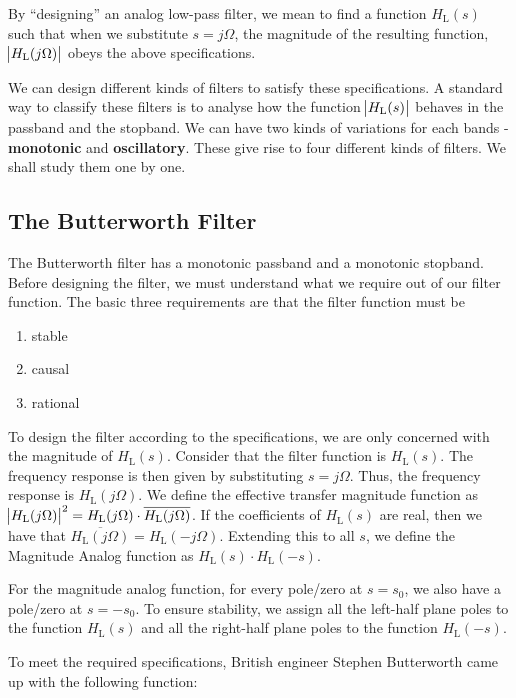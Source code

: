 \documentclass{article}
\theoremstyle{definition}
\begin{document}
By ``designing'' an analog low-pass filter, we mean to find a function $H_{\text{L}}(s)$ such that when we substitute $s = j \Omega$, the magnitude of the resulting function,  $\abs{H_{\text{L}}(j \Omega)}$ obeys the above specifications. \smallskip

We can design different kinds of filters to satisfy these specifications. A standard way to classify these filters is to analyse how the function $\abs{H_{\text{L}}(s)}$ behaves in the passband and the stopband. We can have two kinds of variations for each bands - \textbf{monotonic} and \textbf{oscillatory}. These give rise to four different kinds of filters. We shall study them one by one.

\subsection{The Butterworth Filter}

The Butterworth filter has a monotonic passband and a monotonic stopband. Before designing the filter, we must understand what we require out of our filter function. The basic three requirements are that the filter function must be
\begin{enumerate}
    \item stable
    \item causal
    \item rational
\end{enumerate}

To design the filter according to the specifications, we are only concerned with the magnitude of $H_{\text{L}}(s)$. Consider that the filter function is $H_{\text{L}}(s)$. The frequency response is then given by substituting $s = j \Omega$. Thus, the frequency response is $H_{\text{L}}(j \Omega)$. We define the effective transfer magnitude function as $\abs{H_{\text{L}}(j\Omega)}^2 = H_{\text{L}}(j\Omega) \cdot \overline{H_{\text{L}}(j\Omega)}$. If the coefficients of $H_{\text{L}}(s)$ are real, then we have that $\overline{H_{\text{L}}(j \Omega)} = H_{\text{L}}( -j \Omega)$. Extending this to all $s$, we define the Magnitude Analog function as $H_{\text{L}}(s) \cdot H_{\text{L}}(-s)$. \smallskip

For the magnitude analog function, for every pole/zero at $s=s_0$, we also have a pole/zero at $s = -s_0$. To ensure stability, we assign all the left-half plane poles to the function $H_{\text{L}}(s)$ and all the right-half plane poles to the function $H_{\text{L}}(-s)$. \medskip

To meet the required specifications, British engineer Stephen Butterworth came up with the following function:
\end{document}
